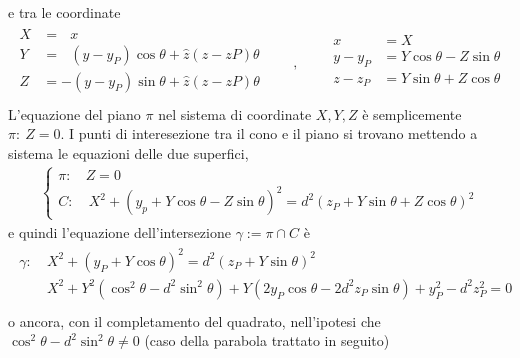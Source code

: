\documentclass[letterpaper,10pt,italian]{jupyterBook}
\begin{document}
\sphinxAtStartPar
e tra le coordinate
\begin{equation*}
\begin{split}
\begin{aligned}
 X & = \ \ \ x \\
 Y & = \ \ \ (y-y_P) \cos \theta + \hat{z} (z-zP) \theta \\
 Z & =     - (y-y_P) \sin \theta + \hat{z} (z-zP) \theta \\
\end{aligned}
\qquad , \qquad
\begin{aligned}
 x       & = X \\
 y - y_P & = Y \cos \theta - Z \sin \theta \\
 z - z_P & = Y \sin \theta + Z \cos \theta \\
\end{aligned}
\end{split}
\end{equation*}
\sphinxAtStartPar
L’equazione del piano  \(\pi\) nel sistema di coordinate \(X,Y,Z\) è semplicemente \(\pi: \ Z = 0\). I punti di interesezione tra il cono e il piano si trovano mettendo a sistema le equazioni delle due superfici,
\begin{equation*}
\begin{split}\begin{cases}
  \pi: & Z = 0 \\
    C: & \ X^2 + (y_p + Y \cos \theta - Z \sin \theta )^2 = d^2 ( z_P + Y \sin \theta + Z \cos \theta )^2
\end{cases}\end{split}
\end{equation*}
\sphinxAtStartPar
e quindi l’equazione dell’intersezione \(\gamma := \pi \cap C\) è
\begin{equation*}
\begin{split}\begin{aligned}
  \gamma: & \ X^2 + (y_P + Y \cos \theta  )^2 = d^2 ( z_P + Y \sin \theta  )^2 \\
          & \ X^2 + Y^2 ( \cos^2 \theta - d^2 \sin^2 \theta ) + Y ( 2 y_P \cos \theta - 2 d^2 z_P \sin \theta ) + y_P^2 - d^2 z_P^2 = 0 \\
\end{aligned}\end{split}
\end{equation*}
\sphinxAtStartPar
o ancora, con il completamento del quadrato, nell’ipotesi che \(\cos^2 \theta - d^2 \sin^2 \theta \ne 0\) (caso della parabola trattato in seguito)
\end{document}
